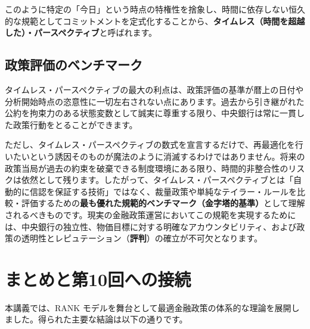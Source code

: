 \documentclass[
  japanese,
  lualatex,
  ja=standard,
  12pt,
  a4paper]{ltjsarticle}
\begin{document}
このように特定の「今日」という時点の特権性を捨象し、時間に依存しない恒久的な規範としてコミットメントを定式化することから、\textbf{タイムレス（時間を超越した）・パースペクティブ}と呼ばれます。

\subsection{政策評価のベンチマーク}\label{ux653fux7b56ux8a55ux4fa1ux306eux30d9ux30f3ux30c1ux30deux30fcux30af}

タイムレス・パースペクティブの最大の利点は、政策評価の基準が暦上の日付や分析開始時点の恣意性に一切左右されない点にあります。過去から引き継がれた公約を拘束力のある状態変数として誠実に尊重する限り、中央銀行は常に一貫した政策行動をとることができます。

ただし、タイムレス・パースペクティブの数式を宣言するだけで、再最適化を行いたいという誘因そのものが魔法のように消滅するわけではありません。将来の政策当局が過去の約束を破棄できる制度環境にある限り、時間的非整合性のリスクは依然として残ります。したがって、タイムレス・パースペクティブとは「自動的に信認を保証する技術」ではなく、裁量政策や単純なテイラー・ルールを比較・評価するための\textbf{最も優れた規範的ベンチマーク（金字塔的基準）}として理解されるべきものです。現実の金融政策運営においてこの規範を実現するためには、中央銀行の独立性、物価目標に対する明確なアカウンタビリティ、および政策の透明性とレピュテーション（\textbf{評判}）の確立が不可欠となります。

\section{まとめと第10回への接続}\label{ux307eux3068ux3081ux3068ux7b2c10ux56deux3078ux306eux63a5ux7d9a}

本講義では、RANK
モデルを舞台として最適金融政策の体系的な理論を展開しました。得られた主要な結論は以下の通りです。
\end{document}
